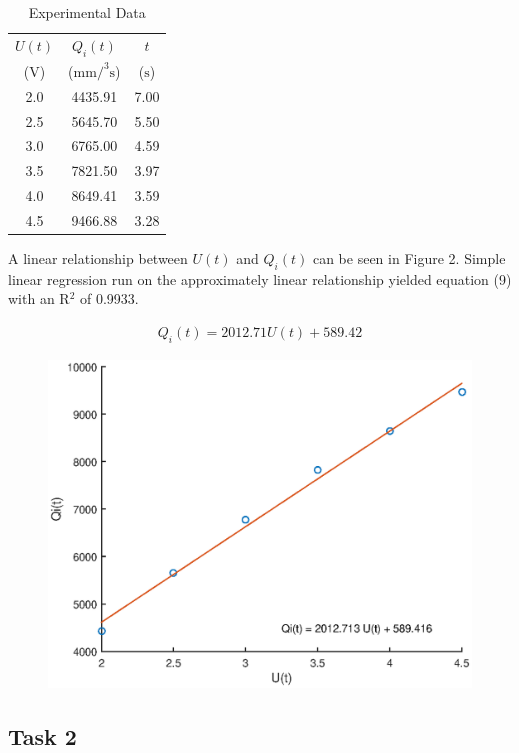 \documentclass{article}
\begin{document}
 \begin{table}[H]
 	\centering
 	\caption{Experimental Data}
 	\begin{tabular}{ccc}
 		\toprule
 		$U(t)$  & $Q_{i}(t)$ & $t$ \\
 		($\si{\volt}$) & ($\si{\milli\meter\per\cubed\second}$) & ($\si{\second}$) \\\midrule
 		2.0 & 4435.91 & 7.00 \\
 		2.5 & 5645.70 & 5.50 \\
 		3.0 & 6765.00 & 4.59 \\
 		3.5 & 7821.50 & 3.97 \\
 		4.0 & 8649.41 & 3.59 \\
 		4.5 & 9466.88 & 3.28 \\\bottomrule
 	\end{tabular}
 \end{table}
 

A linear relationship between $U(t)$ and $Q_{i}(t)$ can be seen in Figure 2. Simple linear regression run on the approximately linear relationship yielded equation (9) with an R$^2$ of 0.9933.

\begin{align}
	Q_{i}(t) = 2012.71U(t) + 589.42
\end{align}


\begin{figure}[H]
	\centering
	\includegraphics[scale=0.5]{fig1.eps}
\end{figure}

\subsection{Task 2}
\end{document}
